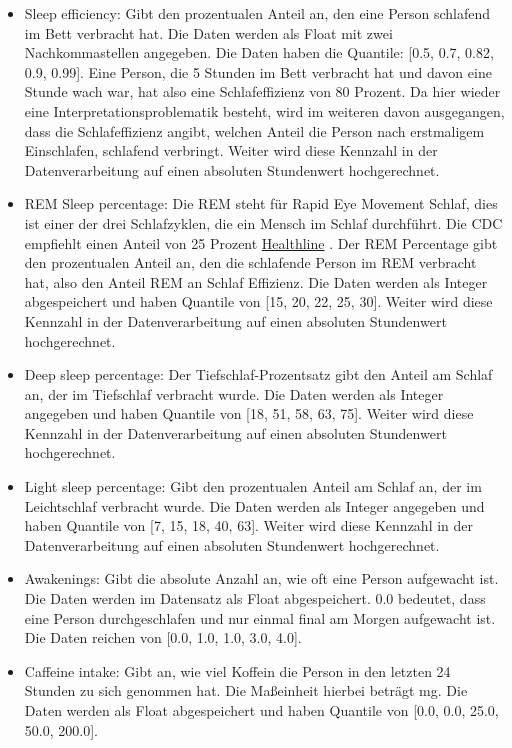 \documentclass[usegeometry=true]{scrartcl}
\begin{document}
\begin{itemize}
  \item Sleep efficiency: Gibt den prozentualen Anteil an, den eine Person schlafend im Bett verbracht hat. Die Daten werden als Float mit zwei Nachkommastellen angegeben. Die Daten haben die Quantile: [0.5, 0.7, 0.82, 0.9, 0.99]. Eine Person, die 5 Stunden im Bett verbracht hat und davon eine Stunde wach war, hat also eine Schlafeffizienz von 80 Prozent. Da hier wieder eine Interpretationsproblematik besteht, wird im weiteren davon ausgegangen, dass die Schlafeffizienz angibt, welchen Anteil die Person nach erstmaligem Einschlafen, schlafend verbringt. Weiter wird diese Kennzahl in der Datenverarbeitung auf einen absoluten Stundenwert hochgerechnet.
  \item REM Sleep percentage: Die REM steht für Rapid Eye Movement Schlaf, dies ist einer der drei Schlafzyklen, die ein Mensch im Schlaf durchführt. Die CDC empfiehlt einen Anteil von 25 Prozent \href{https://www.healthline.com/health/how-much-deep-sleep-do-you-need}{Healthline} . Der REM Percentage gibt den prozentualen Anteil an, den die schlafende Person im REM verbracht hat, also den Anteil REM an Schlaf Effizienz. Die Daten werden als Integer abgespeichert und haben Quantile von [15, 20, 22, 25, 30]. Weiter wird diese Kennzahl in der Datenverarbeitung auf einen absoluten Stundenwert hochgerechnet.
  \item Deep sleep percentage: Der Tiefschlaf-Prozentsatz gibt den Anteil am Schlaf an, der im Tiefschlaf verbracht wurde. Die Daten werden als Integer angegeben und haben Quantile von [18, 51, 58, 63, 75]. Weiter wird diese Kennzahl in der Datenverarbeitung auf einen absoluten Stundenwert hochgerechnet.
 \item Light sleep percentage: Gibt den prozentualen Anteil am Schlaf an, der im Leichtschlaf verbracht wurde. Die Daten werden als Integer angegeben und haben Quantile von [7, 15, 18, 40, 63]. Weiter wird diese Kennzahl in der Datenverarbeitung auf einen absoluten Stundenwert hochgerechnet.
 \item Awakenings: Gibt die absolute Anzahl an, wie oft eine Person aufgewacht ist. Die Daten werden im Datensatz als Float abgespeichert. 0.0 bedeutet, dass eine Person durchgeschlafen und nur einmal final am Morgen aufgewacht ist. Die Daten reichen von [0.0, 1.0, 1.0, 3.0, 4.0].
 \item Caffeine intake: Gibt an, wie viel Koffein die Person in den letzten 24 Stunden zu sich genommen hat. Die Maßeinheit hierbei beträgt mg. Die Daten werden als Float abgespeichert und haben Quantile von [0.0, 0.0, 25.0, 50.0, 200.0].

\end{itemize}
\end{document}
